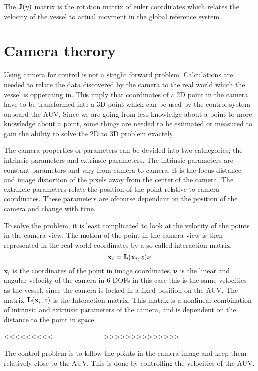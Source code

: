 	The $\mathbf{J}(\mathbf{\eta})$ matrix is the rotation matrix of euler coordinates which relates the velocity of the vessel to actual movment in the global reference system.




\section{Camera therory}
	Using camera for control is not a stright forward problem. Calculations are needed to relate the data discovered by the camera to the real world which the vessel is opperating in. This imply that coordinates of a 2D point in the camera have to be transformed into a 3D point which can be used by the control system onboard the AUV. Since we are going from less knowledge about a point to more knowledge about a point, some things are needed to be estimated or measured to gain the ability to solve the 2D to 3D problem exactely.
	
	The camera properties or parameters can be devided into two cathegories; the intrinsic parameters and extrinsic parameters. The intrinsic parameters are constant parameters and vary from camera to camera. It is the focus distance and image distortion of the pixels away from the center of the camera. The extrincic parameters relate the position of the point relative to camera coordinates. These parameters are ofcourse dependant on the position of the camera and change with time. \cite{robotbok}
	
	To solve the problem, it is least complicated to look at the velocity of the points in the camera view. The motion of the point in the camera view is then represented in the real world coordinates by a so called interaction matrix. \cite{robotbok}
	\begin{equation}
		\label{eq:ch1-camcord2worldcord}
		\dot{\mathbf{x}}_i = \mathbf{L}(\mathbf{x}_i, z) \mathbf{\nu}
	\end{equation}
	$\mathbf{x}_i$ is the coordinates of the point in image coordinates, $\mathbf{\nu}$ is the linear and angular velocity of the camera in 6 DOFs in this case this is the same velocities as the vessel, since the camera is locked in a fixed position on the AUV. The matrix $\mathbf{L}(\mathbf{x}_i, z)$ is the Interaction matrix. This matrix is a nonlinear combination of intrinsic and extrinsic parameters of the camera, and is dependent on the distance to the point in space.
	
	<<<<<<<<<---------------------->>>>>>>>>>>>>>	
	
	The control problem is to follow the points in the camera image and keep them relatively close to the AUV. This is done by controlling the velocities of the AUV. 

